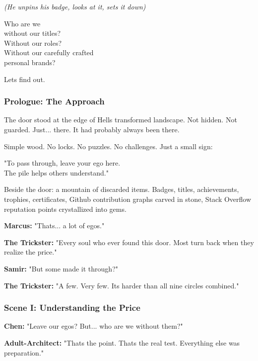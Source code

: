 \emph{(He unpins his badge, looks at it, sets it down)}

Who are we\\
without our titles?\\
Without our roles?\\
Without our carefully crafted\\
personal brands?

Let\textquotesingle s find out.

\bookdivider

\subsubsection{Prologue: The Approach}\label{prologue-the-approach}

The door stood at the edge of Hell\textquotesingle s transformed landscape. Not hidden. Not guarded. Just... there. It had probably always been there.

Simple wood. No locks. No puzzles. No challenges. Just a small sign:

"To pass through, leave your ego here.\\
The pile helps others understand."

Beside the door: a mountain of discarded items. Badges, titles, achievements, trophies, certificates, Github contribution graphs carved in stone, Stack Overflow reputation points crystallized into gems.

\textbf{Marcus:} "That\textquotesingle s... a lot of egos."

\textbf{The Trickster:} "Every soul who ever found this door. Most turn back when they realize the price."

\textbf{Samir:} "But some made it through?"

\textbf{The Trickster:} "A few. Very few. It\textquotesingle s harder than all nine circles combined."

\bookdivider

\subsubsection{Scene I: Understanding the Price}\label{scene-i-understanding-the-price}

\textbf{Chen:} "Leave our egos? But... who are we without them?"

\textbf{Adult-Architect:} "That\textquotesingle s the point. That\textquotesingle s the real test. Everything else was preparation."

